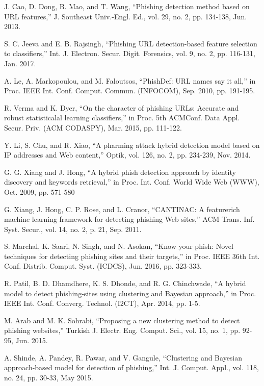 \documentclass{ieeeaccess}
\begin{document}
\begin{thebibliography}{00}
 J. Cao, D. Dong, B. Mao, and T. Wang, ``Phishing detection method
based on URL features,'' J. Southeast Univ.-Engl. Ed., vol. 29, no. 2,
pp. 134-138, Jun. 2013.

 S. C. Jeeva and E. B. Rajsingh, ``Phishing URL detection-based feature selection to classifiers,'' Int. J. Electron. Secur. Digit. Forensics, vol. 9, no. 2, pp. 116-131, Jan. 2017.

 A. Le, A. Markopoulou, and M. Faloutsos, ``PhishDef: URL names say it all,'' in Proc. IEEE Int. Conf. Comput. Commun. (INFOCOM), Sep. 2010,
pp. 191-195.

 R. Verma and K. Dyer, ``On the character of phishing URLs: Accurate and
robust statisticalal learning classifiers,'' in Proc. 5th ACMConf. Data Appl.
Secur. Priv. (ACM CODASPY), Mar. 2015, pp. 111-122.

 Y. Li, S. Chu, and R. Xiao, ``A pharming attack hybrid detection
model based on IP addresses and Web content,'' Optik, vol. 126, no. 2,
pp. 234-239, Nov. 2014.

 G. G. Xiang and J. Hong, ``A hybrid phish detection approach by identity discovery and keywords retrieval,'' in Proc. Int. Conf. World Wide Web
(WWW), Oct. 2009, pp. 571-580

 G. Xiang, J. Hong, C. P. Rose, and L. Cranor, ``CANTINAC: A featurerich
machine learning framework for detecting phishing Web sites,'' ACM
Trans. Inf. Syst. Secur., vol. 14, no. 2, p. 21, Sep. 2011.

 S. Marchal, K. Saari, N. Singh, and N. Asokan, ``Know your phish: Novel
techniques for detecting phishing sites and their targets,'' in Proc. IEEE
36th Int. Conf. Distrib. Comput. Syst. (ICDCS), Jun. 2016, pp. 323-333.

 R. Patil, B. D. Dhamdhere, K. S. Dhonde, and R. G. Chinchwade,
``A hybrid model to detect phishing-sites using clustering and Bayesian
approach,'' in Proc. IEEE Int. Conf. Converg. Technol. (I2CT), Apr. 2014,
pp. 1-5.

 M. Arab and M. K. Sohrabi, ``Proposing a new clustering method to detect
phishing websites,'' Turkish J. Electr. Eng. Comput. Sci., vol. 15, no. 1,
pp. 92-95, Jun. 2015.

 A. Shinde, A. Pandey, R. Pawar, and V. Gangule, ``Clustering and Bayesian
approach-based model for detection of phishing,'' Int. J. Comput. Appl.,
vol. 118, no. 24, pp. 30-33, May 2015.


\end{thebibliography}
\end{document}
